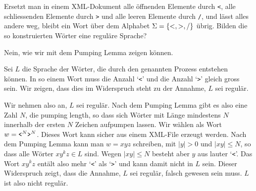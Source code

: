 Ersetzt man in einem XML-Dokument alle öffnenden Elemente durch {\tt <},
alle schliessenden Elemente durch {\tt >} und alle leeren Elemente
durch {\tt /}, und lässt alles andere weg, bleibt ein Wort über
dem Alphabet $\Sigma =\{{\tt <},{\tt >},{\tt /}\}$ übrig.
Bilden die so konstruierten Wörter eine reguläre Sprache?


\begin{loesung}
Nein, wie wir mit dem Pumping Lemma zeigen können.

Sei $L$ die Sprache der Wörter, die durch den genannten Prozess
entstehen können. In so einem Wort muss die Anzahl `{\tt <}' und die
Anzahl `{\tt >}' gleich gross sein. Wir zeigen, dass dies im Widerspruch
steht zu der Annahme, $L$ sei regulär.

Wir nehmen also an, $L$ sei regulär. Nach dem Pumping Lemma gibt
es also eine Zahl $N$, die pumping length, so dass sich Wörter mit
Länge mindestens $N$ innerhalb der ersten $N$ Zeichen aufpumpen lassen.
Wir wählen als Wort $w=\text{\tt <}^N\text{\tt >}^N$. Dieses Wort
kann sicher aus einem XML-File erzeugt werden. Nach dem Pumping
Lemma kann man $w=xyz$ schreiben, mit $|y|>0$ und $|xy|\le N$, so dass
alle Wörter $xy^kz\in L$ sind. Wegen $|xy|\le N$ besteht aber
$y$ aus lauter `{\tt <}'. Das Wort $xy^kz$ entält also mehr
`{\tt <}' als `{\tt >}' und kann damit nicht in $L$ sein. Dieser
Widerspruch zeigt, dass die Annahme, $L$ sei regulär, falsch gewesen
sein muss. $L$ ist also nicht regulär.
\end{loesung}
